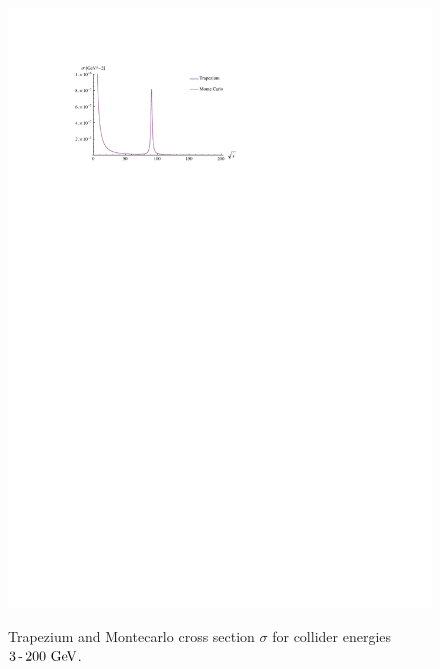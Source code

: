 \documentclass[]{article}
\begin{document}
\begin{figure}[H]
{		\includegraphics[width=\textwidth]{both_combined}
	}
	\caption{Trapezium and Montecarlo cross section $\sigma$ for collider energies $3\operatorname{-}200\GeV$.}
	\label{fig:both}
\end{figure}
\end{document}
